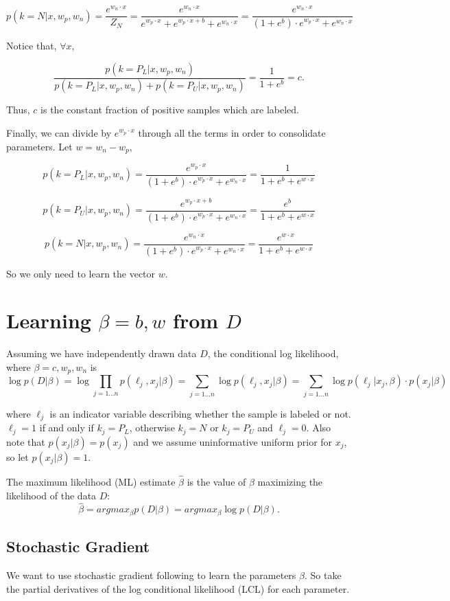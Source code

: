 \documentclass[]{article}
\begin{document}
$$
p(k=N | x, w_p, w_n) =  \frac{e^{w_n \cdot x}}{Z_N} = \frac{e^{w_n \cdot x}}{e^{w_p \cdot x} + e^{w_p \cdot x + b} + e^{w_n \cdot x}} = \frac{e^{w_n \cdot x}}{(1 + e^{b}) \cdot e^{w_p \cdot x} + e^{w_n \cdot x}}
$$

Notice that, $\forall x$,

$$
\frac{p(k=P_L | x, w_p, w_n)}{p(k=P_L | x, w_p, w_n) + p(k=P_U | x, w_p, w_n)} = \frac{1}{1 + e^b} = c.
$$

Thus, $c$ is the constant fraction of positive samples which are labeled.

Finally, we can divide by $e^{w_p \cdot x}$ through all the terms in order to consolidate parameters. Let $w = w_n - w_p$,

$$
p(k=P_L | x, w_p, w_n) = \frac{e^{w_p \cdot x}}{(1 + e^{b}) \cdot e^{w_p \cdot x} + e^{w_n \cdot x}} = \frac{1}{1 + e^b + e^{w \cdot x}}
$$

$$
p(k=P_U | x, w_p, w_n) = \frac{e^{w_p \cdot x + b}}{(1 + e^{b}) \cdot e^{w_p \cdot x} + e^{w_n \cdot x}} = \frac{e^b}{1 + e^b + e^{w \cdot x}}
$$

$$
p(k=N | x, w_p, w_n) = \frac{e^{w_n \cdot x}}{(1 + e^{b}) \cdot e^{w_p \cdot x} + e^{w_n \cdot x}} = \frac{e^{w \cdot x}}{1 + e^b + e^{w \cdot x}}
$$

So we only need to learn the vector $w$.

\section{Learning $\beta = b, w$ from $D$}

Assuming we have independently drawn data $D$, the conditional log likelihood, where $\beta = c, w_p, w_n$ is
$$
\log{p(D | \beta)} = \log \prod_{j=1...n}{p(\ell_j, x_j | \beta)} = \sum_{j=1...n}{\log{p(\ell_j, x_j | \beta)}} = \sum_{j=1...n}{\log{p(\ell_j | x_j, \beta)}} \cdot p(x_j | \beta)
$$

where $\ell_j$ is an indicator variable describing whether the sample is labeled or not. $\ell_j = 1$ if and only if $k_j=P_L$, otherwise $k_j = N$ or $k_j=P_U$ and $\ell_j = 0$.  Also note that $p(x_j|\beta) = p(x_j)$ and we assume uninformative uniform prior for $x_j$, so let $p(x_j|\beta) = 1$.

The maximum likelihood (ML) estimate $\hat \beta$ is the value of $\beta$ maximizing the likelihood of the data $D$:
$$
\hat \beta = arg max_{\beta} p(D | \beta) = arg max_{\beta} \log{p(D | \beta)}.
$$

\subsection{Stochastic Gradient}
We want to use stochastic gradient following to learn the parameters $\beta$. So take the partial derivatives of the log conditional likelihood (LCL) for each parameter.
\end{document}
